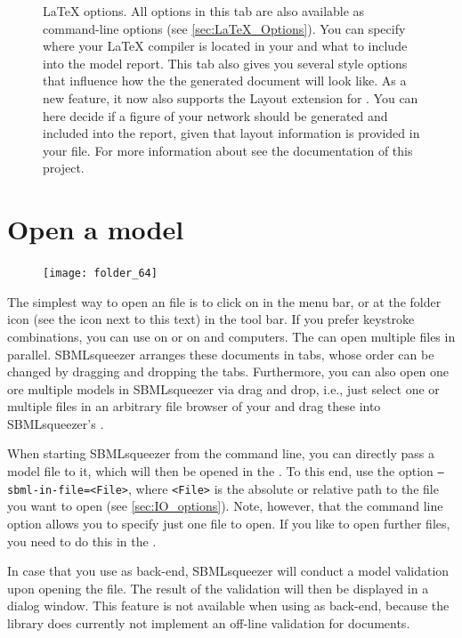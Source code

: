 \begin{figure}
\caption[\LaTeX{} options]{\LaTeX{} options.
All options in this tab are also available as command-line options
(see \vref{sec:LaTeX_Options}).
You can specify where your \LaTeX{} compiler is located in your \OS and what
to include into the model report.
This tab also gives you several style options that influence how the
the generated document will look like.
As a new feature, it now also supports the Layout extension for \SBML
\citep{Gauges2006}.
You can here decide if a figure of your network should be generated and
included into the report, given that layout information is provided in your file.
For more information about \SBMLLaTeX see the documentation of this project.}
\label{fig:LaTeX_Options}
\end{figure}


\section{Open a model}

\begin{figure}
\vspace{\wrapfigspace}
\texttt{[image: folder\_64]}
\end{figure}
The simplest way to open an \SBML file is to click on  in the
menu bar, or at the folder icon (see the icon next to this text) in the tool bar.
If you prefer keystroke combinations, you can use  on \MacOSX or
 on \Windows and \Linux computers.
The \GUI can open multiple \SBML files in parallel.
SBMLsqueezer arranges these \SBML documents in tabs, whose order can be changed by dragging and dropping the tabs.
Furthermore, you can also open one ore multiple models in SBMLsqueezer via drag and drop, i.e., just select one or multiple \SBML files in an arbitrary file browser of your \OS and drag these into SBMLsqueezer's \GUI.

When starting SBMLsqueezer from the command line, you can directly pass a model
file to it, which will then be opened in the \GUI. To this
end, use the option \texttt{--sbml-in-file=<File>}, where \texttt{<File>} is the
absolute or relative path to the \SBML file you want to open (see
\vref{sec:IO_options}).
Note, however, that the command line option allows you to specify just one file
to open.
If you like to open further files, you need to do this in the \GUI.

In case that you use \libSBML as \SBML back-end, SBMLsqueezer will conduct a model validation upon opening the file.
The result of the validation will then be displayed in a dialog window.
This feature is not available when using \JSBML as \SBML back-end, because the \JSBML library does currently not implement an off-line validation for \SBML documents.

